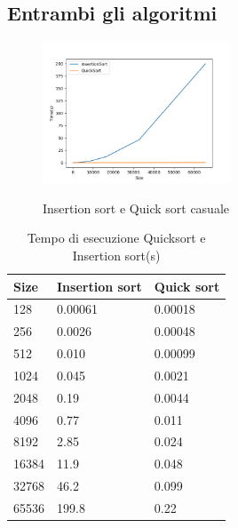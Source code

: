 \documentclass[]{article}
\begin{document}
\subsection{Entrambi gli algoritmi}
\begin{figure}[H]
\centering
	\caption{Insertion sort e Quick sort casuale}
	\includegraphics[width=0.5\textwidth]{InsertionSortEQuicksortCasuale}
	\label{fig:insertion_quick}
	
\end{figure}

\begin{table}[H]
\caption{Tempo di esecuzione Quicksort e Insertion sort(s)}
\label{tab:insertion_quick}
\centering
\begin{tabular}{|l|l|l|} 
\hline
Size  & Insertion sort & Quick sort  \\ 
\hline
128   & 0.00061        & 0.00018     \\
256   & 0.0026         & 0.00048     \\
512   & 0.010          & 0.00099     \\
1024  & 0.045          & 0.0021      \\
2048  & 0.19           & 0.0044      \\
4096  & 0.77           & 0.011       \\
8192  & 2.85           & 0.024       \\
16384 & 11.9           & 0.048       \\
32768 & 46.2           & 0.099       \\
65536 & 199.8          & 0.22        \\
\hline
\end{tabular}
\end{table}
\end{document}
